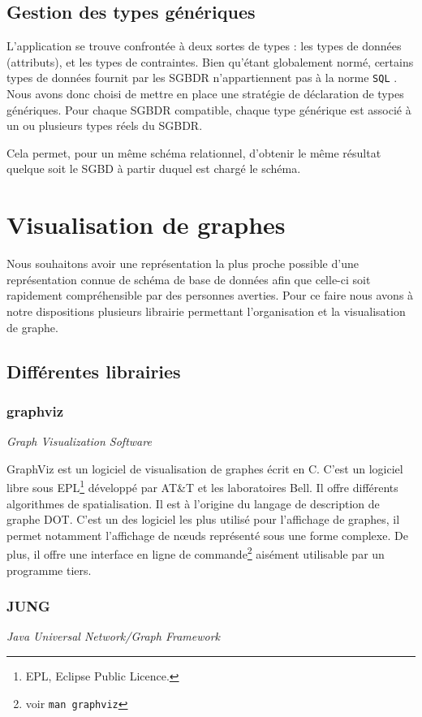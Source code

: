 	\subsection{Gestion des types génériques}
	\label{section:generic_types}
	L'application se trouve confrontée à deux sortes de types : les types de données (attributs), et les types de contraintes. Bien qu'étant globalement normé, certains types de données fournit par les SGBDR n'appartiennent pas à la norme \texttt{SQL} . Nous avons donc choisi de mettre en place une stratégie de déclaration de types génériques. Pour chaque SGBDR compatible, chaque type générique est associé à un ou plusieurs types réels du SGBDR.
	
	Cela permet, pour un même schéma relationnel, d'obtenir le même résultat quelque soit le SGBD à partir duquel est chargé le schéma.

\section{Visualisation de graphes}
	
	Nous souhaitons avoir une représentation la plus proche possible d'une représentation connue de schéma de base de données afin que celle-ci soit rapidement compréhensible par des personnes averties. Pour ce faire nous avons à notre dispositions plusieurs librairie permettant l'organisation et la visualisation de graphe.

  \subsection{Différentes librairies}
  	\subsubsection{graphviz} \textit{Graph Visualization Software}
  	
			GraphViz est un logiciel de visualisation de graphes écrit en C. C'est un logiciel libre sous EPL\footnote{EPL, Eclipse Public Licence.} développé par AT\&T et les laboratoires Bell. Il offre différents algorithmes de spatialisation. Il est à l'origine du langage de description de graphe DOT. C'est un des logiciel les plus utilisé pour l'affichage de graphes, il permet notamment l'affichage de nœuds représenté sous une forme complexe. De plus, il offre une interface en ligne de commande\footnote{voir \texttt{man graphviz}} aisément utilisable par un programme tiers.
		\subsubsection{JUNG} \textit{Java Universal Network/Graph Framework}
		
